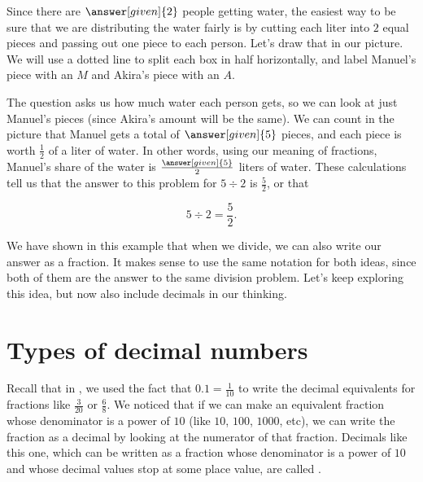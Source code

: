 \documentclass{ximera}
\begin{document}
\begin{example}
Since there are $\answer[given]{2}$ people getting water, the easiest way to be sure that we are distributing the water fairly is by cutting each liter into $2$ equal pieces and passing out one piece to each person. Let's draw that in our picture. We will use a dotted line to split each box in half horizontally, and label Manuel's piece with an $M$ and Akira's piece with an $A$.

\begin{image}
\end{image}

The question asks us how much water each person gets, so we can look at just Manuel's pieces (since Akira's amount will be the same). We can count in the picture that Manuel gets a total of $\answer[given]{5}$ pieces, and each piece is worth $\frac{1}{2}$ of a liter of water. In other words, using our meaning of fractions, Manuel's share of the water is $\frac{\answer[given]{5}}{2}$ liters of water. These calculations tell us that the answer to this problem for $5 \div 2$ is $\frac{5}{2}$, or that

\[
5 \div 2 = \frac{5}{2}.
\]

\end{example}


We have shown in this example that when we divide, we can also write our answer as a fraction. It makes sense to use the same notation for both ideas, since both of them are the answer to the same division problem. Let's keep exploring this idea, but now also include decimals in our thinking.

\section{Types of decimal numbers}


Recall that in , we used the fact that $0.1 = \frac{1}{10}$ to write the decimal equivalents for fractions like $\frac{3}{20}$ or $\frac{6}{8}$.  We noticed that if we can make an equivalent fraction whose denominator is a power of $10$ (like $10$, $100$, $1000$, etc), we can write the fraction as a decimal by looking at the numerator of that fraction. Decimals like this one, which can be written as a fraction whose denominator is a power of $10$ and whose decimal values stop at some place value, are called . 
\end{document}
